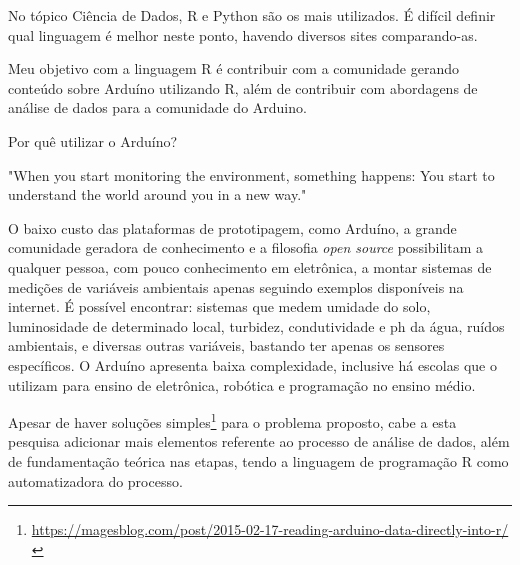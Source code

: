 No tópico Ciência de Dados, R e Python são os mais utilizados. É difícil definir 
qual linguagem é melhor neste ponto, havendo diversos sites comparando-as.

Meu objetivo com a linguagem R é contribuir com a 
comunidade gerando conteúdo sobre Arduíno utilizando R, além de contribuir com 
abordagens de análise de dados para a comunidade do Arduino.


Por quê utilizar o Arduíno? 
\begin{citacao}[english]
  "When you start monitoring the environment,
  something happens: You start to understand the world around you in a new way." \cite{Gertz2012}
\end{citacao}

O baixo custo das plataformas de prototipagem, como Arduíno, a 
grande comunidade geradora de conhecimento e a filosofia \emph{open source}
possibilitam a qualquer pessoa, com pouco conhecimento em eletrônica, a
montar sistemas de medições de variáveis ambientais apenas seguindo exemplos 
disponíveis na internet. É possível encontrar: sistemas que medem umidade do 
solo, luminosidade de determinado local, turbidez, condutividade e ph da água, ruídos 
ambientais, e diversas outras variáveis, bastando ter apenas os sensores 
específicos. O Arduíno apresenta baixa complexidade, inclusive há escolas que o utilizam 
para ensino de eletrônica, robótica e programação no ensino médio.
 
Apesar de haver soluções simples\footnote{\url{https://magesblog.com/post/2015-02-17-reading-arduino-data-directly-into-r/}}
para o problema proposto, cabe a esta pesquisa adicionar mais elementos 
referente ao processo de análise de dados, além de fundamentação teórica nas 
etapas, tendo a linguagem de programação R como automatizadora do processo.